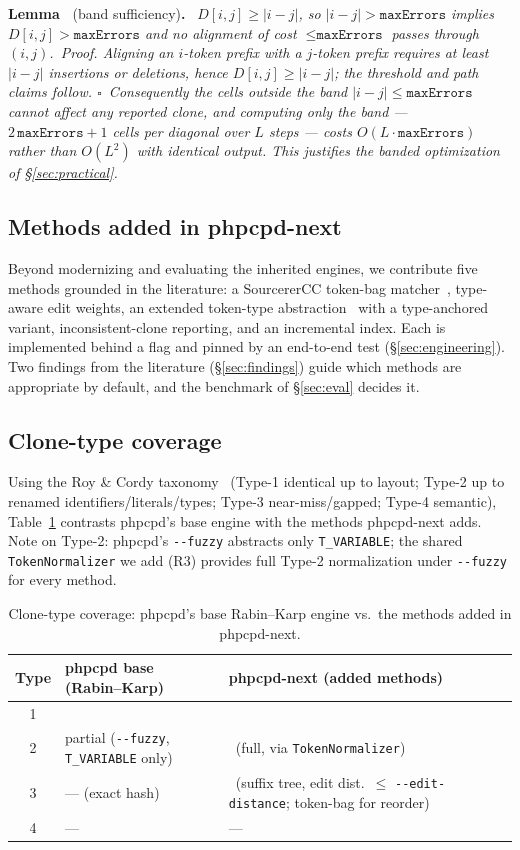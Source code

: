 \documentclass[10pt,a4paper]{article}
\newcounter{prop}[section]
\newcounter{lem}[section]
\newcommand{\lem}[1]{\par\medskip\refstepcounter{lem}%
  \noindent\textbf{Lemma~\thelem} (#1)\textbf{.}\ \itshape}
\begin{document}
\lem{band sufficiency}
$D[i,j]\ge |i-j|$, so $|i-j| > \texttt{maxErrors}$ implies $D[i,j] > \texttt{maxErrors}$ and no
alignment of cost $\le \texttt{maxErrors}$ passes through $(i,j)$.\upshape\
\emph{Proof.} Aligning an $i$-token prefix with a $j$-token prefix requires at least $|i-j|$ insertions
or deletions, hence $D[i,j]\ge|i-j|$; the threshold and path claims follow. $\square$\ Consequently the
cells outside the band $|i-j|\le\texttt{maxErrors}$ cannot affect any reported clone, and computing only
the band --- $2\,\texttt{maxErrors}+1$ cells per diagonal over $L$ steps --- costs
$O(L\cdot\texttt{maxErrors})$ rather than $O(L^2)$ with identical output. This justifies the banded
optimization of \S\ref{sec:practical}.

\subsection{Methods added in phpcpd-next}
Beyond modernizing and evaluating the inherited engines, we contribute five methods grounded in the
literature: a SourcererCC token-bag matcher~\cite{sourcerercc}, type-aware edit weights, an extended
token-type abstraction~\cite{toma} with a type-anchored variant, inconsistent-clone reporting, and an
incremental index. Each is implemented behind a flag and pinned by an end-to-end test
(\S\ref{sec:engineering}). Two findings from the literature (\S\ref{sec:findings}) guide which methods
are appropriate by default, and the benchmark of \S\ref{sec:eval} decides it.

\subsection{Clone-type coverage}
Using the Roy \& Cordy taxonomy~\cite{roycordy} (Type-1 identical up to layout; Type-2 up to renamed
identifiers/literals/types; Type-3 near-miss/gapped; Type-4 semantic), Table~\ref{tab:coverage}
contrasts phpcpd's base engine with the methods phpcpd-next adds. Note on Type-2: phpcpd's
\texttt{-{}-fuzzy} abstracts only \lstinline!T_VARIABLE!; the shared \texttt{TokenNormalizer} we add
(R3) provides full Type-2 normalization under \texttt{-{}-fuzzy} for every method.

\begin{table}[h]
\centering
\caption{Clone-type coverage: phpcpd's base Rabin--Karp engine vs.\ the methods added in phpcpd-next.}
\label{tab:coverage}
\small
\begin{tabular}{c p{4.2cm} p{5.2cm}}
\toprule
\textbf{Type} & \textbf{phpcpd base (Rabin--Karp)} & \textbf{phpcpd-next (added methods)} \\
\midrule
1 & \checkmark & \checkmark \\
2 & partial (\texttt{-{}-fuzzy}, \lstinline!T_VARIABLE! only) & \checkmark\ (full, via \texttt{TokenNormalizer}) \\
3 & --- (exact hash) & \checkmark\ (suffix tree, edit dist.\ $\le$ \texttt{-{}-edit-distance}; token-bag for reorder) \\
4 & --- & --- \\
\bottomrule
\end{tabular}
\end{table}
\end{document}
